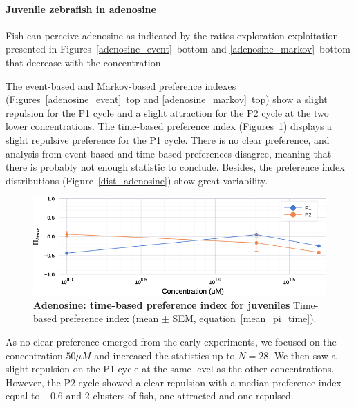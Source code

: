   \paragraph{Juvenile zebrafish in adenosine} Fish can perceive adenosine as indicated by the ratios exploration-exploitation presented in Figures~\ref{adenosine_event}~bottom and \ref{adenosine_markov}~bottom that decrease with the concentration.

  The event-based and Markov-based preference indexes (Figures~\ref{adenosine_event}~top and \ref{adenosine_markov}~top) show a slight repulsion for the P1 cycle and a slight attraction for the P2 cycle at the two lower concentrations.  The time-based preference index (Figures~\ref{adenosine}) displays a slight repulsive preference for the P1 cycle. There is no clear preference, and analysis from event-based and time-based preferences disagree, meaning that there is probably not enough statistic to conclude. Besides, the preference index distributions (Figure~\ref{dist_adenosine}) show great variability.

    \begin{figure}[h!]
      \centering
      \includegraphics[width=1\textwidth]{part_2/assets/adenosine.png}
      \caption{\textbf{Adenosine: time-based preference index for juveniles} Time-based preference index (mean $\pm$ SEM, equation~\ref{mean_pi_time}).}
      \label{adenosine}
    \end{figure}

  As no clear preference emerged from the early experiments, we focused on the concentration $50 \mu M$ and increased the statistics up to $N=28$. We then saw a slight repulsion on the P1 cycle at the same level as the other concentrations. However, the P2 cycle showed a clear repulsion with a median preference index equal to $-0.6$ and 2 clusters of fish, one attracted and one repulsed.

